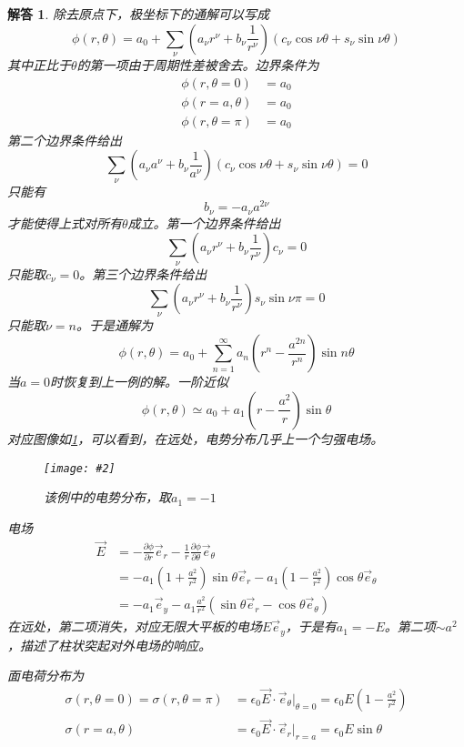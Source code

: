 \documentclass[a4paper,11pt]{ctexart}
\newcommand{\cpic}[2]{
\begin{center}
\texttt{[image: \#2]}
\end{center}
}
\newcommand{\cpicn}[3]
{
\begin{figure}[H]
\cpic{#1}{#2}
\caption{#3\label{#2}}
\end{figure}
}
\newtheorem{ans}{解答}[section]
\newcommand{\beq}{\begin{equation}}
\newcommand{\eeq}{\end{equation}}
\newcommand{\bea}{\begin{equation}\begin{aligned}}
\newcommand{\eea}{\end{aligned}\end{equation}}
\newcommand{\epv}{\epsilon_0}
\newcommand{\pfrac}[2]{\frac{\partial #1}{\partial #2}}
\begin{document}
\begin{ans}
除去原点下，极坐标下的通解可以写成
\beq
\phi(r,\theta) = a_0 + \sum_{\nu} \left(a_\nu r^\nu + b_\nu \frac{1}{r^\nu} \right) \left( c_\nu \cos \nu \theta + s_\nu \sin \nu \theta \right)
\eeq
其中正比于$\theta$的第一项由于周期性差被舍去。边界条件为
\bea
\phi(r,\theta = 0) &= a_0\\
\phi(r=a,\theta)&=a_0\\
\phi(r,\theta = \pi) &= a_0
\eea
第二个边界条件给出
\beq
\sum_\nu \left(a_\nu a^\nu + b_\nu \frac{1}{a^\nu} \right) \left( c_\nu \cos \nu \theta + s_\nu \sin \nu \theta \right) = 0
\eeq
只能有
\beq
b_\nu = - a_\nu a^{2\nu}
\eeq
才能使得上式对所有$\theta$成立。第一个边界条件给出
\beq
\sum_\nu \left(a_\nu r^\nu + b_\nu \frac{1}{r^\nu} \right) c_\nu = 0
\eeq
只能取$c_\nu =0$。第三个边界条件给出
\beq
\sum_{\nu} \left(a_\nu r^\nu + b_\nu \frac{1}{r^\nu} \right) s_\nu \sin \nu \pi = 0
\eeq
只能取$\nu = n$。于是通解为
\beq
\phi(r,\theta) = a_0 + \sum_{n=1}^\infty a_n \left(r^n - \frac{a^{2n}}{r^n}\right) \sin n \theta
\eeq
当$a=0$时恢复到上一例的解。一阶近似
\beq
\phi(r,\theta) \simeq a_0 + a_1 \left(r-\frac{a^2}{r}\right) \sin \theta
\eeq
对应图像如\cref{2_3p2}，可以看到，在远处，电势分布几乎上一个匀强电场。
\cpicn{0.3}{2_3p2}{该例中的电势分布，取$a_1 = -1$}
电场
\bea
\vec{E} &= -\pfrac{\phi}{r} \vec{e}_r - \frac{1}{r} \pfrac{\phi}{\theta} \vec{e}_\theta \\
&= -a_1\left( 1 + \frac{a^2}{r^2} \right) \sin \theta \vec{e}_r - a_1 \left(1 - \frac{a^2}{r^2}\right)\cos \theta \vec{e}_\theta \\
&= -a_1 \vec{e}_y -a_1 \frac{a^2}{r^2} (\sin \theta \vec{e}_r-\cos \theta \vec{e}_\theta)
\eea
在远处，第二项消失，对应无限大平板的电场$E\vec{e}_y$，于是有$a_1 = -E$。第二项$\sim a^2$，描述了柱状突起对外电场的响应。
\par
面电荷分布为
\bea
\sigma(r,\theta = 0) = \sigma(r,\theta = \pi) &= \epv \vec{E}\cdot \vec{e}_\theta \big|_{\theta = 0} = \epv E\left(1 - \frac{a^2}{r^2}\right) \\
\sigma(r=a,\theta) &= \epv \vec{E} \cdot \vec{e}_r \big|_{r=a} = \epv E\sin \theta
\eea
\par


\end{ans}
\end{document}
